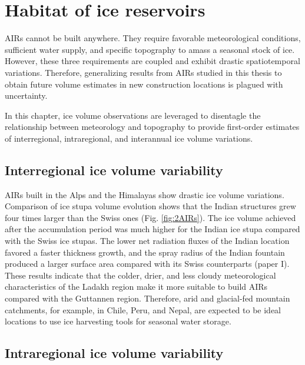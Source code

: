 \chapter{Habitat of ice reservoirs}


\ac{AIRs} cannot be built anywhere. They require favorable meteorological conditions, sufficient water supply,
and specific topography to amass a seasonal stock of ice. However, these three requirements are coupled and
exhibit drastic spatiotemporal variations. Therefore, generalizing results from \ac{AIRs} studied in this thesis to
obtain future volume estimates in new construction locations is plagued with uncertainty.

In this chapter, ice volume observations are leveraged to disentagle the relationship between meteorology
and topography to provide first-order estimates of interregional, intraregional, and interannual ice volume
variations. 

\section{Interregional ice volume variability}

\ac{AIRs} built in the Alps and the Himalayas show drastic ice volume variations. Comparison of ice stupa volume
evolution shows that the Indian structures grew four times larger than the Swiss ones (Fig. \ref{fig:2AIRs}). The
ice volume achieved after the accumulation period was much higher for the Indian ice stupa compared with the Swiss
ice stupas. The lower net radiation fluxes of the Indian location favored a faster thickness growth, and the
spray radius of the Indian fountain produced a larger surface area compared with its Swiss counterparts (paper I).
These results indicate that the colder, drier, and less cloudy meteorological characteristics of the Ladakh
region make it more suitable to build \ac{AIRs} compared with the Guttannen region. Therefore, arid and
glacial-fed mountain catchments, for example, in Chile, Peru, and Nepal, are expected to be ideal locations to use
ice harvesting tools for seasonal water storage.

\section{Intraregional ice volume variability}

